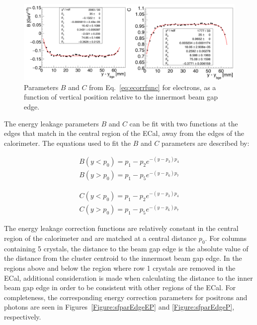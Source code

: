 \begin{figure}[htb]
  \centering
      \includegraphics[width=1.0\textwidth]{pics/performance/sfparEdgeFit.png}
  \caption[ECal energy shower parameters for electrons relative to the inside beam gap edge]{Parameters $B$ and $C$ from Eq.~\ref{eq:ecorrfunc} for electrons, as a function of vertical position
relative to the innermost beam gap edge.}
  \label{Figure:sfparEdge}
\end{figure}
The energy leakage parameters $B$ and $C$ can be fit with two functions at the edges that match in the central region of the ECal, away from the edges of the calorimeter. The equations used to fit the $B$ and $C$ parameters are described by:

\begin{equation}
\begin{split}
\label{eq:p1parlt}
B(y<p_0) = p_1-p_2 e^{-(y-p_3)p_4}\\
B(y>p_0) = p_1-p_5 e^{-(y-p_6)p_7}
\end{split}
\end{equation}

\begin{equation}
\begin{split}
\label{eq:p2parlt}
C(y<p_0) = p_1-p_2 e^{-(y-p_3)p_4}\\
C(y>p_0) = p_1-p_5 e^{-(y-p_6)p_7}
\end{split}
\end{equation}

The energy leakage correction functions are relatively constant in the central region of the calorimeter and are matched at a central distance $p_0$. For columns containing 5 crystals, the distance to the beam gap edge is the absolute value of the distance from the cluster centroid to the innermost beam gap edge. In the regions above and below the region where row 1 crystals are removed in the ECal, additional consideration is made when calculating the distance to the inner beam gap edge in order to be consistent with other regions of the ECal. For completeness, the corresponding energy correction parameters for positrons and photons are seen in Figures~\ref{Figure:sfparEdgeEP} and \ref{Figure:sfparEdgeP}, respectively. 

